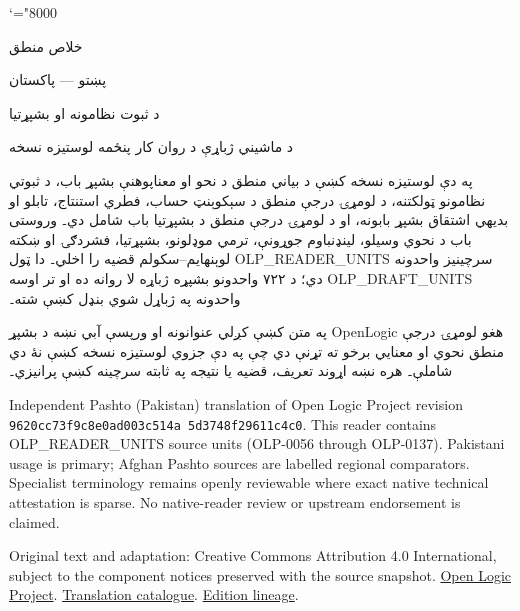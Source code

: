 \documentclass[12pt,a4paper,oneside]{report}
\theoremstyle{definition}
\begin{document}
\setRTL
\mathcode`\!="8000
\begin{titlepage}
\thispagestyle{empty}
\begin{center}
\vspace*{24mm}
{\Huge خلاص منطق}\par\bigskip
{\Large پښتو — پاکستان}\par\bigskip
{\LARGE د ثبوت نظامونه او بشپړتيا}\par\bigskip
د ماشيني ژباړې د روان کار پنځمه لوستيزه نسخه
\end{center}
\bigskip
په دې لوستيزه نسخه کښې د بياني منطق د نحو او معناپوهنې بشپړ باب،
د ثبوتي نظامونو ټولکتنه، د لومړۍ درجې منطق د سېکوېنټ حساب، فطري
استنتاج، تابلو او بديهي اشتقاق بشپړ بابونه، او د لومړۍ درجې منطق د
بشپړتيا باب شامل دي۔ وروستی باب د نحوي وسيلو، لينډنباوم جوړونې، ترمي
موډلونو، بشپړتيا، فشردګۍ او ښکته لوېنهايم–سکولم قضيه را اخلي۔ دا ټول
OLP_READER_UNITS سرچينيز واحدونه دي؛ د ۷۲۲ واحدونو بشپړه ژباړه لا
روانه ده او تر اوسه OLP_DRAFT_UNITS واحدونه په ژباړل شوي بنډل کښې
شته۔

په متن کښې کږلي عنوانونه او ورپسې آبي \LR{\latinfont [OLP]} نښه د
بشپړ OpenLogic هغو لومړۍ درجې منطق نحوي او معنايي برخو ته تړنې دي چې
په دې جزوي لوستيزه نسخه کښې نۀ دي شاملې۔ هره نښه اړوند تعريف، قضيه
يا نتيجه په ثابته سرچينه کښې پرانيزي۔

\begin{LTR}\latinfont\small
Independent Pashto (Pakistan) translation of Open Logic Project revision
\texttt{9620cc73\allowbreak f9c8e0ad\allowbreak 003c514a\allowbreak
5d3748f2\allowbreak 9611c4c0}. This reader contains
OLP_READER_UNITS source units (OLP-0056 through OLP-0137). Pakistani usage is
primary; Afghan Pashto sources are labelled regional comparators. Specialist
terminology remains openly reviewable where exact native technical attestation
is sparse. No native-reader review or upstream endorsement is claimed.

Original text and adaptation: Creative Commons Attribution 4.0 International,
subject to the component notices preserved with the source snapshot.
\href{https://openlogicproject.org/}{Open Logic Project}.\quad
\href{https://github.com/KokunoYumeto/OpenLogic-translations}{Translation catalogue}.\quad
\href{https://doi.org/10.5281/zenodo.22307197}{Edition lineage}.
\end{LTR}
\end{titlepage}
\tableofcontents
\clearpage
\end{document}
